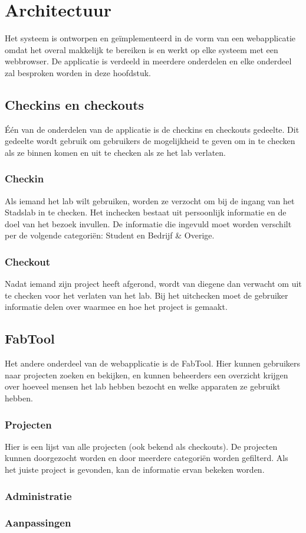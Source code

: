 \chapter{Architectuur}

Het systeem is ontworpen en ge\"implementeerd in de vorm van een webapplicatie omdat het overal makkelijk te bereiken is en werkt op elke systeem met een webbrowser. De applicatie is verdeeld in meerdere onderdelen en elke onderdeel zal besproken worden in deze hoofdstuk.

\section{Checkins en checkouts}

\'E\'en van de onderdelen van de applicatie is de checkins en checkouts gedeelte. Dit gedeelte wordt gebruik om gebruikers de mogelijkheid te geven om in te checken als ze binnen komen en uit te checken als ze het lab verlaten.

\subsection{Checkin}

Als iemand het lab wilt gebruiken, worden ze verzocht om bij de ingang van het Stadslab in te checken. Het inchecken bestaat uit persoonlijk informatie en de doel van het bezoek invullen. De informatie die ingevuld moet worden verschilt per de volgende categori\"en: Student en Bedrijf \& Overige.

\subsection{Checkout}

Nadat iemand zijn project heeft afgerond, wordt van diegene dan verwacht om uit te checken voor het verlaten van het lab. Bij het uitchecken moet de gebruiker informatie delen over waarmee en hoe het project is gemaakt.

\section{FabTool}

Het andere onderdeel van de webapplicatie is de FabTool. Hier kunnen gebruikers naar projecten zoeken en bekijken, en kunnen beheerders een overzicht krijgen over hoeveel mensen het lab hebben bezocht en welke apparaten ze gebruikt hebben.

\subsection{Projecten}

Hier is een lijst van alle projecten (ook bekend als checkouts). De projecten kunnen doorgezocht worden en door meerdere categori\"en worden gefilterd. Als het juiste project is gevonden, kan de informatie ervan bekeken worden.

\subsection{Administratie}

\subsection{Aanpassingen}